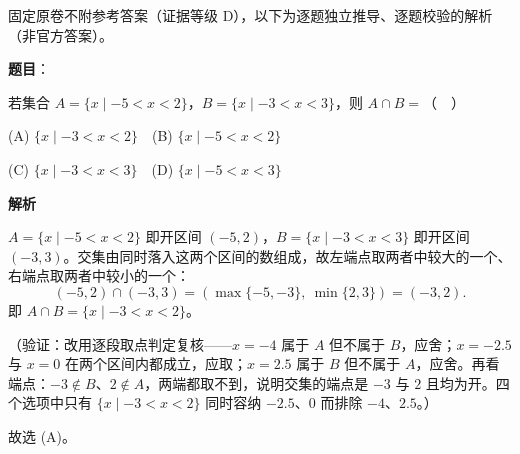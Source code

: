 
\begin{gktip}
固定原卷不附参考答案（证据等级 D），以下为逐题独立推导、逐题校验的解析（非官方答案）。
\end{gktip}

\begin{answer}

\textbf{题目}：

若集合 \(A=\{x\mid -5<x<2\}\)，\(B=\{x\mid -3<x<3\}\)，则 \(A\cap B=\)（　）

(A) \(\{x\mid -3<x<2\}\)　(B) \(\{x\mid -5<x<2\}\)

(C) \(\{x\mid -3<x<3\}\)　(D) \(\{x\mid -5<x<3\}\)

\textbf{解析}

\(A=\{x\mid -5<x<2\}\) 即开区间 \((-5,2)\)，\(B=\{x\mid -3<x<3\}\) 即开区间 \((-3,3)\)。交集由同时落入这两个区间的数组成，故左端点取两者中较大的一个、右端点取两者中较小的一个：
\nopagebreak[4]
\[
(-5,2)\cap(-3,3)=(\max\{-5,-3\},\ \min\{2,3\})=(-3,2).
\]
即 \(A\cap B=\{x\mid -3<x<2\}\)。

（验证：改用逐段取点判定复核——\(x=-4\) 属于 \(A\) 但不属于 \(B\)，应舍；\(x=-2.5\) 与 \(x=0\) 在两个区间内都成立，应取；\(x=2.5\) 属于 \(B\) 但不属于 \(A\)，应舍。再看端点：\(-3\notin B\)、\(2\notin A\)，两端都取不到，说明交集的端点是 \(-3\) 与 \(2\) 且均为开。四个选项中只有 \(\{x\mid -3<x<2\}\) 同时容纳 \(-2.5\)、\(0\) 而排除 \(-4\)、\(2.5\)。）

故选 (A)。


\end{answer}
